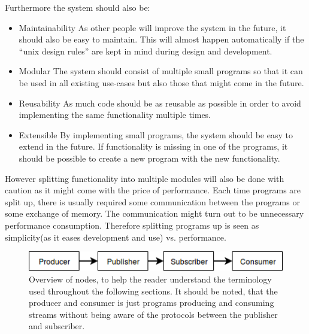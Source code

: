 

Furthermore the system should also be:

\begin{itemize}
	\item Maintainability
As other people will improve the system in the future, it should also be easy to maintain. This will almost happen automatically if the “unix design rules” are kept in mind during design and development.
\item Modular
The system should consist of multiple small programs so that it can be used in all existing use-cases but also those that might come in the future.
\item Reusability
As much code should be as reusable as possible in order to avoid implementing the same functionality multiple times.
\item Extensible
    By implementing small programs, the system should be easy to extend in the future.
    If functionality is missing in one of the programs, it should be possible to create a new 
    program with the new functionality.
\end{itemize}

However splitting functionality into multiple modules will also be done with caution as it might come with the price of performance. Each time programs are split up, there is usually required some communication between the programs or some exchange of memory. The communication might turn out to be unnecessary performance consumption. Therefore splitting programs up is seen as simplicity(as it eases development and use) vs. performance.



\begin{figure}[h!]
	\includegraphics[width=1\textwidth]{figures/analysis-terminilogy-overview.png}
	\caption{Overview of nodes, to help the reader understand the terminology used throughout the following sections. It should be noted, that the producer and consumer is just programs producing and consuming streams without being aware of the protocols between the publisher and subscriber.}
\end{figure}

